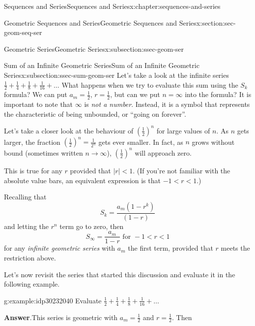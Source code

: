 \documentclass[twoside,10pt,]{book}
\newcommand{\blocktitlefont}{\relax}
\numberwithin{equation}{section}
\newcommand{\lt}{<}
\begin{document}
\begin{chapterptx}{Sequences and Series}{}{Sequences and Series}{}{}{x:chapter:sequences-and-series}
\begin{sectionptx}{Geometric Sequences and Series}{}{Geometric Sequences and Series}{}{}{x:section:sec-geom-seq-ser}
\begin{subsectionptx}{Geometric Series}{}{Geometric Series}{}{}{x:subsection:ssec-geom-ser}
%
\end{subsectionptx}
%
%
\typeout{************************************************}
\typeout{************************************************}
%
\begin{subsectionptx}{Sum of an Infinite Geometric Series}{}{Sum of an Infinite Geometric Series}{}{}{x:subsection:ssec-sum-geom-ser}
Let's take a look at the infinite series \(\frac{1}{2} + \frac{1}{4} + \frac{1}{8} + \frac{1}{{16}} + \ldots\) What happens when we try to evaluate this sum using the \(S_k\) formula?  We can put \(a_m = \frac{1}{2}\), \(r = \frac{1}{2}\), but can we put \(n = \infty\) into the formula?  It is important to note that \(\infty\) is \emph{not a number}.  Instead, it is a symbol that represents the characteristic of being unbounded, or ``going on forever''.%
\par
Let's take a closer look at the behaviour of \((\frac{1}{2})^n\) for large values of \(n\).  As \(n\) gets larger, the fraction \({\left( {\frac{1}{2}} \right)^n} = \frac{1}{{{2^n}}}\) gets ever smaller.  In fact, as \(n\) grows without bound (sometimes written \(n\to\infty\)), \((\frac{1}{2})^n \) will approach zero.%
\par
This is true for any \(r\) provided that \(|r| \lt 1\).  (If you're not familiar with the absolute value bars, an equivalent expression is that \(-1 \lt r \lt 1\).)%
\par
Recalling that%
\begin{equation*}
{S_k} = \frac{{{a_m}\left( {1 - {r^k}} \right)}}{{\left( {1 - r} \right)}}
\end{equation*}
and letting the \(r^n\) term go to zero, then%
\begin{equation*}
{S_\infty } = \frac{{{a_m}}}{{1 - r}} \text{ for } -1 \lt r \lt 1
\end{equation*}
for any \emph{infinite geometric series} with \(a_m\) the first term, provided that \(r\) meets the restriction above.%
\par
Let's now revisit the series that started this discussion and evaluate it in the following example. \begin{example}{}{g:example:idp30232040}%
Evaluate \(\frac{1}{2} + \frac{1}{4} + \frac{1}{8} + \frac{1}{{16}} +\ldots\)\par\smallskip%
\noindent\textbf{\blocktitlefont Answer}.\label{g:answer:idp30234216}{}\hypertarget{g:answer:idp30234216}{}\quad{}This series is geometric with \(a_m = \frac{1}{2}\) and \(r = \frac{1}{2}\).  Then%

\end{example}
\end{subsectionptx}
\end{sectionptx}
\end{chapterptx}
\end{document}
